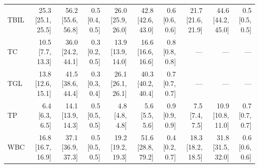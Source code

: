 \begin{table}[ht]
\begin{tabular}{lrrrrrrrrr}
TBIL & 25.3 [25.1, 25.5] & 56.2 [55.6, 56.8] & 0.5 [0.4, 0.5] & 26.0 [25.9, 26.0] & 42.8 [42.6, 43.0] & 0.6 [0.6, 0.6] & 21.7 [21.6, 21.9] & 44.6 [44.2, 45.0] & 0.5 [0.5, 0.5] \\
TC & 10.5 [7.7, 13.3] & 36.0 [24.2, 44.1] & 0.3 [0.2, 0.5] & 13.9 [13.9, 14.0] & 16.6 [16.6, 16.6] & 0.8 [0.8, 0.8] & --- & --- & --- \\
TGL & 13.8 [12.6, 15.1] & 41.5 [38.6, 44.4] & 0.3 [0.3, 0.4] & 26.1 [26.1, 26.1] & 40.3 [40.2, 40.4] & 0.7 [0.7, 0.7] & --- & --- & --- \\
TP & 6.4 [6.3, 6.5] & 14.1 [13.9, 14.3] & 0.5 [0.5, 0.5] & 4.8 [4.8, 4.8] & 5.6 [5.5, 5.6] & 0.9 [0.9, 0.9] & 7.5 [7.4, 7.5] & 10.9 [10.8, 11.0] & 0.7 [0.7, 0.7] \\
WBC & 16.8 [16.7, 16.9] & 37.1 [36.9, 37.3] & 0.5 [0.5, 0.5] & 19.2 [19.2, 19.3] & 51.6 [28.8, 79.2] & 0.4 [0.2, 0.7] & 18.3 [18.2, 18.5] & 31.8 [31.5, 32.0] & 0.6 [0.6, 0.6] \\
\bottomrule
\end{tabular}
\label{tab:08_variability}
\end{table}